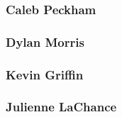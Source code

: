\subsubsection*{Caleb Peckham}

\subsubsection*{Dylan Morris}

\subsubsection*{Kevin Griffin}

\subsubsection*{Julienne La\+Chance}